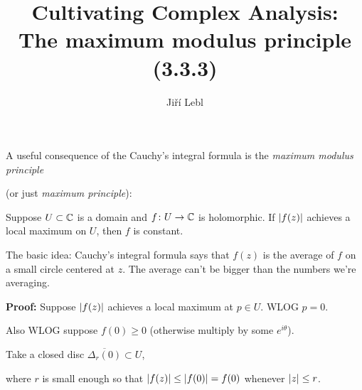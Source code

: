 \documentclass[10pt,aspectratio=169]{beamer}
\author{Ji\v{r}\'i Lebl}
\institute[OSU]{%
Departemento pri Matematiko de Oklahoma {\^S}tata Universitato}
\title{Cultivating Complex Analysis:\\%
The maximum modulus principle (3.3.3)}
\date{}
\begin{document}
\begin{frame}
\titlepage
\end{frame}

\begin{frame}
A useful consequence of the Cauchy's integral formula is the
\emph{maximum modulus principle}

(or just \emph{maximum principle}):

\pause

\begin{theorem}
Suppose $U \subset {\mathbb{C}}$ is a domain and
$f \colon U \to {\mathbb{C}}$ is holomorphic.
\pause
If $\lvert {f(z)} \rvert$ achieves a local maximum on $U$, then $f$ is constant.
\end{theorem}

\pause

The basic idea:
Cauchy's integral formula says that $f(z)$ is the average of $f$ on a
small circle centered at $z$.
The average can't be bigger than the numbers we're averaging.

\pause
\medskip

\textbf{Proof:}
Suppose $\lvert {f(z)} \rvert$ achieves a local maximum at $p \in U$.  WLOG $p=0$.

\medskip
\pause

Also WLOG suppose $f(0) \geq 0$ (otherwise multiply by some $e^{i\theta}$).

\medskip
\pause

Take a closed disc $\overline{\Delta_r(0)} \subset U$,

where $r$ is small enough so that
$\lvert {f(z)} \rvert \leq \lvert {f(0)} \rvert = f(0)$ whenever $\lvert {z} \rvert \leq r$.

\end{frame}
\end{document}
